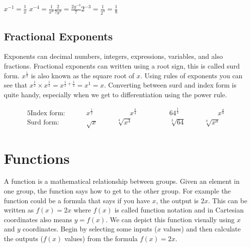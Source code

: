 \begin{tcolorbox}
	\hspace{1cm}$x^{-1}=\frac{1}{x}$ \hspace{2cm}$x^{-4}=\frac{1}{x^4}$\hspace{2cm}$\frac{2}{7y^3}=\frac{2y^{-3}}{7} $\hspace{2cm}$2^{-3}=\frac{1}{2^3}=\frac{1}{8} $
\end{tcolorbox}	

\subsection*{Fractional Exponents}
Exponents can decimal numbers, integers, expressions, variables, and also fractions. Fractional exponents can written using a root sign, this is called surd form. $x^{\frac{1}{2}}$ is also known as the square root of $x$. Using rules of exponents you can see that $x^{\frac{1}{2}}\times x^{\frac{1}{2}}=x^{\frac{1}{2}+\frac{1}{2}}=x^1=x$. Converting between surd and index form is quite handy, especially when we get to differentiation using the power rule.
\begin{tcolorbox}\begin{alignat*}{5}
\textrm{Index form: }\qquad&x^{\frac{1}{2}}&\qquad\qquad x^{\frac{3}{4}} &\qquad\qquad 64^{\frac{1}{3}}&\qquad\qquad x^\frac{a}{b}\\
\textrm{Surd form: }\qquad&\sqrt{x}&\qquad \sqrt[4]{x^3}&\qquad\qquad\sqrt[3]{64}&\qquad \sqrt[b]{x^a}
\end{alignat*}\end{tcolorbox}
	
\section{Functions}\label{sec:functions}	
A function is a mathematical relationship between groups. Given an element in one group, the function says how to get to the other group. For example the function could be a formula that says if you have $x$, the output is $2x$. This can be written as $f(x)=2x$ where $f(x)$ is called function notation and in Cartesian coordinates also means $y=f(x)$. We can depict this function visually using $x$ and $y$ coordinates. Begin by selecting some inputs ($x$ values) and then calculate the outputs ($f(x)$ values) from the formula $f(x)=2x$.

